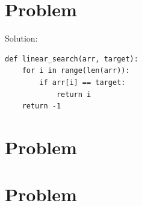 \documentclass[11pt]{article}
\newcounter{problem}
\newenvironment{problem}[1]{%
  \setcounter{problem}{#1}%
  \section*{Problem \theproblem}%
}{\bigskip}
\begin{document}
\newpage 
\begin{problem}{1}
Solution:
\begin{lstlisting}
def linear_search(arr, target):
    for i in range(len(arr)):
        if arr[i] == target:
            return i
    return -1
\end{lstlisting}
\end{problem}

\begin{problem}{2}
\end{problem}

\begin{problem}{3}
\end{problem}

\end{document}
